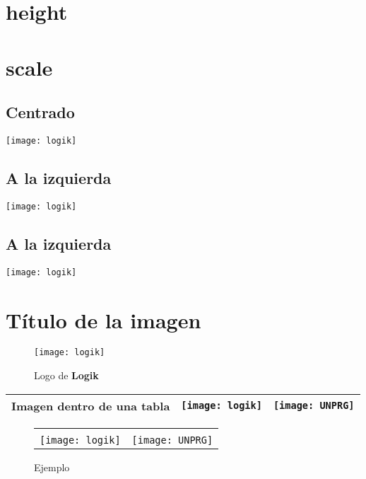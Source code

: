 \documentclass[11pt,a4paper]{article}
\begin{document}
\section{height}

\section{scale}
\subsection{Centrado}
\begin{center}
\texttt{[image: logik]}
\end{center}


\subsection{A la izquierda}
\begin{flushleft}
\texttt{[image: logik]}
\end{flushleft}


\subsection{A la izquierda}
\begin{flushright}
\texttt{[image: logik]}
\end{flushright}

\section{Título de la imagen}

\begin{figure}[h]
\texttt{[image: logik]}
\caption{Logo de {\bf Logik}}
\end{figure}

\begin{tabular}{c|c|c}
\hline 
Imagen dentro de una tabla & \texttt{[image: logik]} & \texttt{[image: UNPRG]}\\ [0.5cm]\hline
\end{tabular}

\begin{figure}[h!]
\begin{center}
\begin{tabular}{|c|c|}
\hline \\ [0.2cm]
\texttt{[image: logik]} & \texttt{[image: UNPRG]} \\  \hline 
\end{tabular}
\caption{Ejemplo}
\end{center}
\end{figure}
\end{document}
